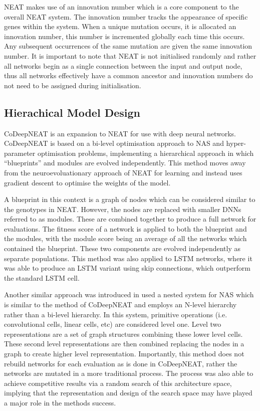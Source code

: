 \documentclass{article}
\begin{document}
		NEAT makes use of an innovation number which is a core component to the overall NEAT system. The innovation number tracks the appearance of specific genes within the system. When a unique mutation occurs, it is allocated an innovation number, this number is incremented globally each time this occurs. Any subsequent occurrences of the same mutation are given the same innovation number. It is important to note that NEAT is not initialised randomly and rather all networks begin as a single connection between the input and output node, thus all networks effectively have a common ancestor and innovation numbers do not need to be assigned during initialisation.


	

	\subsection{Hierachical Model Design}

		CoDeepNEAT \cite{25} is an expansion to NEAT for use with deep neural networks. CoDeepNEAT is based on a bi-level optimisation approach to NAS and hyper-parameter optimisation problems, implementing a hierarchical approach in which “blueprints” and modules are evolved independently. This method moves away from the neuroevoluationary approach of NEAT for learning and instead uses gradient descent to optimise the weights of the model.

		A blueprint in this context is a graph of nodes which can be considered similar to the genotypes in NEAT. However, the nodes are replaced with smaller DNNs referred to as modules. These are combined together to produce a full network for evaluations. The fitness score of a network is applied to both the blueprint and the modules, with the module score being an average of all the networks which contained the blueprint. These two components are evolved independently as separate populations. This method was also applied to LSTM networks, where it was able to produce an LSTM variant using skip connections, which outperform the standard LSTM cell.


		Another similar approach was introduced in \cite{4} used a nested system for NAS which is similar to the method of CoDeepNEAT and employs an N-level hierarchy rather than a bi-level hierarchy. In this system, primitive operations (i.e. convolutional cells, linear cells, etc) are considered level one. Level two representations are a set of graph structures combining these lower level cells. These second level representations are then combined replacing the nodes in a graph to create higher level representation. Importantly, this method does not rebuild networks for each evaluation as is done in CoDeepNEAT, rather the networks are mutated in a more traditional process. The process was also able to achieve competitive results via a random search of this architecture space, implying that  the representation and design of the search space may have played a major role in the methods success.  
\end{document}
